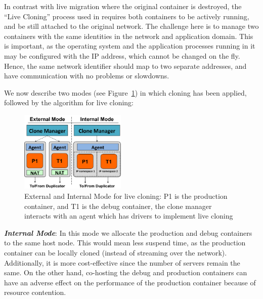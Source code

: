 In contrast with live migration where the original container is destroyed, the ``Live Cloning'' process used in \parikshan requires both containers to be actively running, and be still attached to the original network.
The challenge here is to manage two containers with the same identities in the network and application domain. 
This is important, as the operating system and the application processes running in it may be configured with the IP address, which cannot be changed on the fly.
Hence, the same network identifier should map to two separate addresses, and have communication with no problems or slowdowns.

We now describe two modes (see Figure~\ref{fig:modesCloning}) in which cloning has been applied, followed by the algorithm for live cloning:

\begin{figure}[t]
  \begin{center}
    \includegraphics[width=0.45\textwidth]{figs/ModesCloning.png}
    \caption{External and Internal Mode for live cloning: P1 is the production container, and T1 is the debug container, the clone manager interacts with an agent which has drivers to implement live cloning}
    \label{fig:modesCloning}
  \end{center}
\end{figure}


\noindent
\textbf{\textit{Internal Mode}}: In this mode we allocate the production and debug containers to the same host node. 
This would mean less suspend time, as the production container can be locally cloned (instead of streaming over the network). 
Additionally, it is more cost-effective since the number of servers remain the same.
On the other hand, co-hosting the debug and production containers can have an adverse effect on the performance of the production container because of resource contention.


